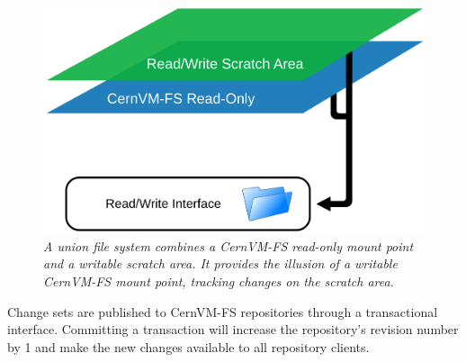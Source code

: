 \begin{figure}[h]
\centering
\includegraphics[scale=0.12]{figures/union}
\caption{\textit{A union file system combines a CernVM-FS read-only mount point and a writable scratch area. It provides the illusion of a writable CernVM-FS mount point, tracking changes on the scratch area.}}
\end{figure}

Change sets are published to CernVM-FS repositories through a transactional interface. Committing a transaction will increase the repository's revision number by 1 and make the new changes available to all repository clients.